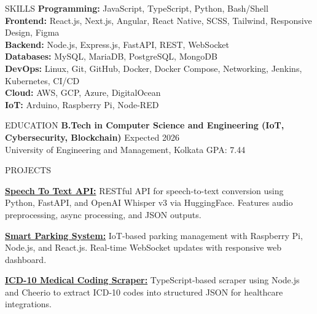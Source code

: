 \documentclass{resume}
\begin{document}
\begin{rSection}{SKILLS}
	\textbf{Programming:} JavaScript, TypeScript, Python, Bash/Shell \\
	\textbf{Frontend:} React.js, Next.js, Angular, React Native, SCSS, Tailwind, Responsive Design, Figma \\
	\textbf{Backend:} Node.js, Express.js, FastAPI, REST, WebSocket \\
	\textbf{Databases:} MySQL, MariaDB, PostgreSQL, MongoDB \\
	\textbf{DevOps:} Linux, Git, GitHub, Docker, Docker Compose, Networking, Jenkins, Kubernetes, CI/CD \\
	\textbf{Cloud:} AWS, GCP, Azure, DigitalOcean \\
	\textbf{IoT:} Arduino, Raspberry Pi, Node-RED
\end{rSection}
\begin{rSection}{EDUCATION}
	\textbf{B.Tech in Computer Science and Engineering (IoT, Cybersecurity, Blockchain)} \hfill {Expected 2026}\\
	University of Engineering and Management, Kolkata \hfill GPA: 7.44
\end{rSection}
\begin{rSection}{PROJECTS}
	\item \textbf{\href{https://github.com/Arkapravo-Ghosh/speech-to-text}{Speech To Text API:}} RESTful API for speech-to-text conversion using Python, FastAPI, and OpenAI Whisper v3 via HuggingFace. Features audio preprocessing, async processing, and JSON outputs.
	\item \textbf{\href{https://github.com/Arkapravo-Ghosh/Smart-Parking-System}{Smart Parking System:}} IoT-based parking management with Raspberry Pi, Node.js, and React.js. Real-time WebSocket updates with responsive web dashboard.
	\item \textbf{\href{https://github.com/Arkapravo-Ghosh/icd10-scrapper}{ICD-10 Medical Coding Scraper:}} TypeScript-based scraper using Node.js and Cheerio to extract ICD-10 codes into structured JSON for healthcare integrations.
\end{rSection}
\end{document}

